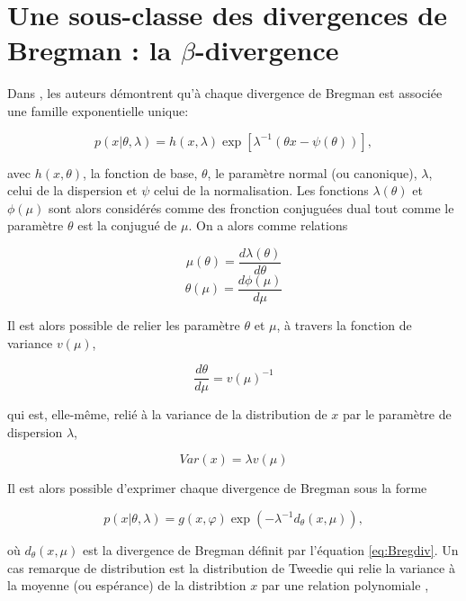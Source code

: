 \section{Une sous-classe des divergences de Bregman : la $\beta$-divergence}

Dans \cite{banerjee2005clustering}, les auteurs démontrent qu'à chaque divergence de Bregman est associée une famille exponentielle unique: 

\begin{equation} \label{eq:modele_disp_exp}
p\left(x\vert \theta,\lambda\right) = h(x,\lambda) \exp\left[\lambda^{-1}\left(\theta x-\psi(\theta) \right)\right], 
\end{equation}

avec $h(x,\theta) $, la fonction de base, $\theta$, le paramètre normal (ou canonique), $\lambda$, celui de la dispersion et $\psi$ celui de la normalisation. Les fonctions $\lambda(\theta)$ et $\phi(\mu)$ sont alors considérés comme des fronction conjuguées dual tout comme le paramètre $\theta$ est la conjugué de $\mu$. On a alors comme relations

\begin{equation}\label{eq:mu1}
\mu(\theta) = \frac{d\lambda(\theta)}{d\theta}
\end{equation}
\begin{equation}\label{eq:mu2}
\theta(\mu) = \frac{d\phi(\mu)}{d\mu}
\end{equation}

Il est alors possible de relier les paramètre $\theta$ et $\mu$, à travers la fonction de variance $v(\mu)$, 

\begin{equation}
\frac{d\theta}{d\mu} = v(\mu)^{-1}
\end{equation}

qui est, elle-même, relié à la variance de la distribution de $x$ par le paramètre de dispersion $\lambda$, 

\begin{equation}
Var(x) = \lambda v(\mu)
\end{equation}

Il est alors possible d'exprimer chaque divergence de Bregman sous la forme 

\begin{equation} \label{eq:g_exp}
p\left(x\vert \theta,\lambda\right) = g(x,\varphi) \exp\left(-\lambda^{-1} d_{\theta}(x,\mu) \right), 
\end{equation}

où $d_{\theta}(x,\mu)$ est la divergence de Bregman définit par l'équation \ref{eq:Bregdiv}. Un cas remarque de distribution est la distribution de Tweedie \cite{jorgensen_exponential_1987} qui relie la variance à la moyenne (ou espérance) de la distribtion $x$ par une relation polynomiale \cite{yilmaz_alpha/beta_2012}, 

